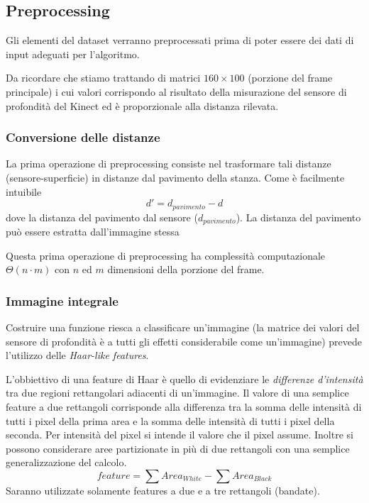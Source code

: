 \documentclass[a4paper,11pt,oneside]{article}
\begin{document}

		\subsection{Preprocessing} %
		\label{sub:preprocessing}
			Gli elementi del dataset verranno preprocessati prima di poter essere dei dati di input adeguati per l'algoritmo.

			Da ricordare che stiamo trattando di matrici $160 \times 100$ (porzione del frame principale) i cui valori corrispondo al risultato della misurazione del sensore di profondità del Kinect ed è proporzionale alla distanza rilevata.

			\subsubsection{Conversione delle distanze} %
			\label{ssub:conversione_delle_distanze}
				La prima operazione di preprocessing consiste nel trasformare tali distanze (sensore-superficie) in distanze dal pavimento della stanza. Come è facilmente intuibile
				$$ d' = d_{pavimento} - d $$
				dove la distanza del pavimento dal sensore ($d_{pavimento}$). La distanza del pavimento può essere estratta dall'immagine stessa

				Questa prima operazione di preprocessing ha complessità computazionale $\Theta(n \cdot m)$ con $n$ ed $m$ dimensioni della porzione del frame.

			\subsubsection{Immagine integrale} %
			\label{ssub:immagine_integrale}
				Costruire una funzione riesca a classificare un'immagine (la matrice dei valori del sensore di profondità è a tutti gli effetti considerabile come un'immagine) prevede l'utilizzo delle \emph{Haar-like features}.

				L'obbiettivo di una feature di Haar è quello di evidenziare le \emph{differenze d'intensità} tra due regioni rettangolari adiacenti di un'immagine. Il valore di una semplice feature a due rettangoli corrisponde alla differenza tra la somma delle intensità di tutti i pixel della prima area e la somma delle intensità di tutti i pixel della seconda. Per intensità del pixel si intende il valore che il pixel assume. Inoltre si possono considerare aree partizionate in più di due rettangoli con una semplice generalizzazione del calcolo.
				$$feature = \sum Area_{White} - \sum Area_{Black}$$
				Saranno utilizzate solamente features a due e a tre rettangoli (bandate).
\end{document}
